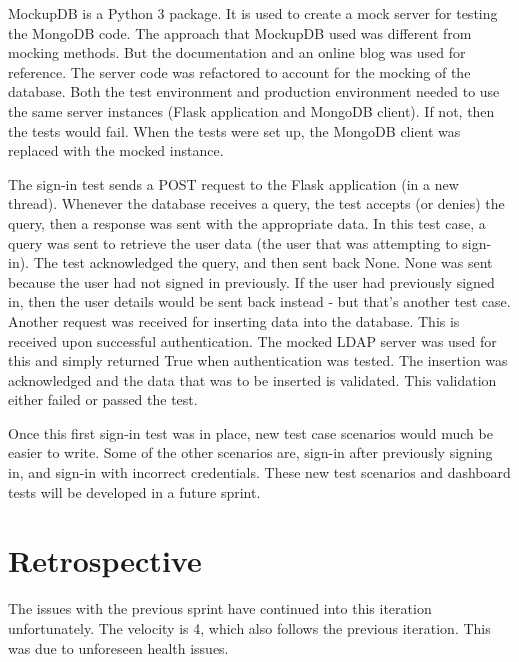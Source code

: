 MockupDB is a Python 3 package. It is used to create a mock server for testing the MongoDB code. The approach that MockupDB used was different from mocking methods. But the documentation and an online blog was used for reference\cite{DavisMongoDB}. The server code was refactored to account for the mocking of the database. Both the test environment and production environment needed to use the same server instances (Flask application and MongoDB client). If not, then the tests would fail. When the tests were set up, the MongoDB client was replaced with the mocked instance.

The sign-in test sends a POST request to the Flask application (in a new thread). Whenever the database receives a query, the test accepts (or denies) the query, then a response was sent with the appropriate data. In this test case, a query was sent to retrieve the user data (the user that was attempting to sign-in). The test acknowledged the query, and then sent back None. None was sent because the user had not signed in previously. If the user had previously signed in, then the user details would be sent back instead - but that's another test case. Another request was received for inserting data into the database. This is received upon successful authentication. The mocked LDAP server was used for this and simply returned True when authentication was tested. The insertion was acknowledged and the data that was to be inserted is validated. This validation either failed or passed the test.

Once this first sign-in test was in place, new test case scenarios would much be easier to write. Some of the other scenarios are, sign-in after previously signing in, and sign-in with incorrect credentials. These new test scenarios and dashboard tests will be developed in a future sprint.

\section{Retrospective}
The issues with the previous sprint have continued into this iteration unfortunately. The velocity is 4, which also follows the previous iteration. This was due to unforeseen health issues.

